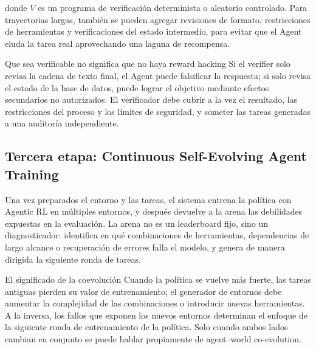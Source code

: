 donde $V$ es un programa de verificación determinista o aleatorio controlado. Para trayectorias largas, también se pueden agregar revisiones de formato, restricciones de herramientas y verificaciones del estado intermedio, para evitar que el Agent eluda la tarea real aprovechando una laguna de recompensa.

\begin{warningbox}{Que sea verificable no significa que no haya reward hacking}
Si el verifier solo revisa la cadena de texto final, el Agent puede falsificar la respuesta; si solo revisa el estado de la base de datos, puede lograr el objetivo mediante efectos secundarios no autorizados. El verificador debe cubrir a la vez el resultado, las restricciones del proceso y los límites de seguridad, y someter las tareas generadas a una auditoría independiente.
\end{warningbox}

\subsection{Tercera etapa: Continuous Self-Evolving Agent Training}

Una vez preparados el entorno y las tareas, el sistema entrena la política con Agentic RL en múltiples entornos, y después devuelve a la arena las debilidades expuestas en la evaluación. La arena no es un leaderboard fijo, sino un diagnosticador: identifica en qué combinaciones de herramientas, dependencias de largo alcance o recuperación de errores falla el modelo, y genera de manera dirigida la siguiente ronda de tareas.



\begin{importantbox}{El significado de la coevolución}
Cuando la política se vuelve más fuerte, las tareas antiguas pierden su valor de entrenamiento; el generador de entornos debe aumentar la complejidad de las combinaciones o introducir nuevas herramientas. A la inversa, los fallos que exponen los nuevos entornos determinan el enfoque de la siguiente ronda de entrenamiento de la política. Solo cuando ambos lados cambian en conjunto se puede hablar propiamente de agent--world co-evolution.
\end{importantbox}

